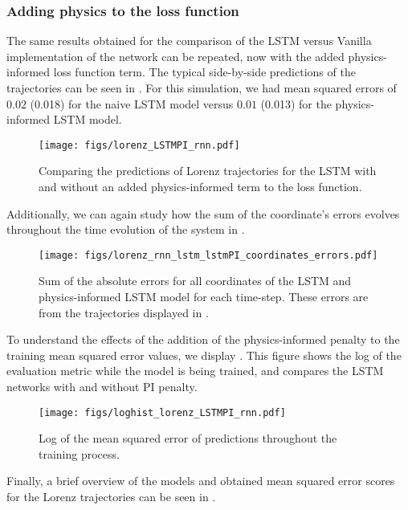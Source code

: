 \subsubsection{Adding physics to the loss function}

The same results obtained for the comparison of the LSTM versus Vanilla implementation of the network can be repeated, now with the added physics-informed loss function term. The typical side-by-side predictions of the trajectories can be seen in . For this simulation, we had mean squared errors of $0.02$ (0.018) for the naive LSTM model versus $0.01$ (0.013) for the physics-informed LSTM model.

\begin{figure}[H]
\texttt{[image: figs/lorenz\_LSTMPI\_rnn.pdf]}
    \caption{Comparing the predictions of Lorenz trajectories for the LSTM with and without an added physics-informed term to the loss function.}
    \label{fig:rnn_pi_lorenz}
\end{figure}


Additionally, we can again study how the sum of the coordinate's errors evolves throughout the time evolution of the system in . 

\begin{figure}[H]
\texttt{[image: figs/lorenz\_rnn\_lstm\_lstmPI\_coordinates\_errors.pdf]}
    \caption{Sum of the absolute errors for all coordinates of the LSTM and physics-informed LSTM model for each time-step. These errors are from the trajectories displayed in .}
    \label{fig:lorenz_rnn_lstm_lstmPI_coordinates_errors}
\end{figure}


To understand the effects of the addition of the physics-informed penalty to the training mean squared error values, we display . This figure shows the log of the evaluation metric while the model is being trained, and compares the LSTM networks with and without PI penalty. 

\begin{figure}[H]
\texttt{[image: figs/loghist\_lorenz\_LSTMPI\_rnn.pdf]}
    \caption{Log of the mean squared error of predictions throughout the training process.}
    \label{fig:loghist_lorenz_LSTMPI_rnn}
\end{figure}


Finally, a brief overview of the models and obtained mean squared error scores for the Lorenz trajectories can be seen in .



